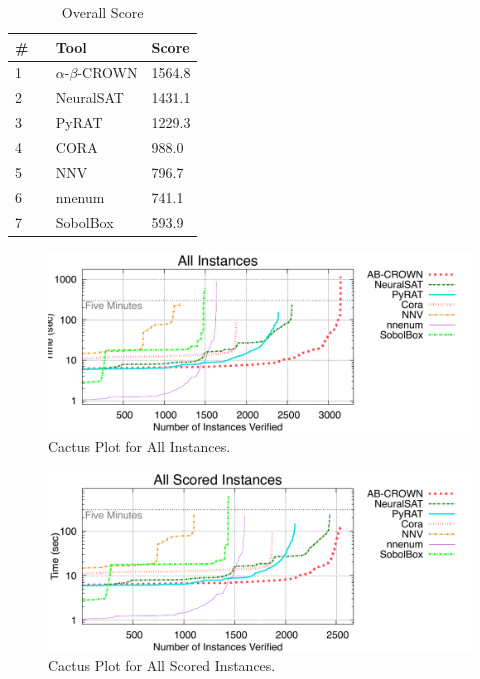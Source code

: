 

\begin{table}[h]
\begin{center}
\caption{Overall Score} \label{tab:score}
{\setlength{\tabcolsep}{2pt}
\begin{tabular}[h]{@{}lll@{}}
\toprule
\textbf{\# ~} & \textbf{Tool} & \textbf{Score}\\
\midrule
1 & $\alpha$-$\beta$-CROWN & 1564.8 \\
2 & NeuralSAT & 1431.1 \\
3 & PyRAT & 1229.3 \\
4 & CORA & 988.0 \\
5 & NNV & 796.7 \\
6 & nnenum & 741.1 \\
7 & SobolBox & 593.9 \\
\bottomrule
\end{tabular}
}
\end{center}
\end{table}



\begin{figure}[h]
\centerline{\includegraphics[width=\textwidth]{cactus/all.pdf}}
\caption{Cactus Plot for All Instances.}
\label{fig:quantPic}
\end{figure}


\begin{figure}[h]
\centerline{\includegraphics[width=\textwidth]{cactus/all_scored.pdf}}
\caption{Cactus Plot for All Scored Instances.}
\label{fig:quantPic}
\end{figure}

